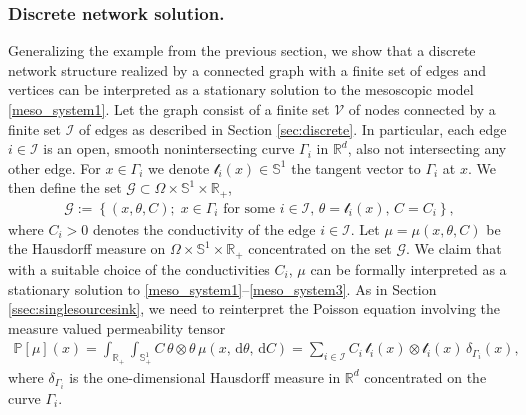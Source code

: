 \documentclass{article}
\numberwithin{equation}{section}
\newcommand{\R}{\mathbb{R}}
\def\[{\begin{eqnarray*}}
\def\]{\end{eqnarray*}}
\def\d{\,\mathrm{d}}
\begin{document}
\subsubsection{Discrete network solution.}\label{ssec:discretenetsol}
Generalizing the example from the previous section, we show that a discrete network structure realized by a connected graph
with a finite set of edges and vertices can be interpreted as a stationary solution to the mesoscopic model \eqref{meso_system1}.
Let the graph consist of a finite set $\mathcal{V}$ of nodes connected by a finite set $\mathcal{I}$ of edges as described in Section \ref{sec:discrete}.
In particular, each edge $i\in \mathcal{I}$ is an open, smooth nonintersecting curve $\Gamma_i$ in $\R^d$, also not intersecting any other edge.
For $x\in\Gamma_i$ we denote $\mathcal{t}_i(x)\in\mathbb{S}^1$ the tangent vector to $\Gamma_i$ at $x$.
We then define the set $\mathcal{G}\subset \Omega\times\mathbb{S}^1\times \R_+$,
\[
   \mathcal{G} := \left\{ (x,\theta,C);\; x\in \Gamma_i \mbox{ for some } i\in\mathcal{I},\, \theta=\mathcal{t}_i(x),\, C=C_i \right\},
\]
where $C_i>0$ denotes the conductivity of the edge $i\in \mathcal{I}$.
Let $\mu = \mu(x,\theta,C)$ be the Hausdorff measure on $\Omega\times\mathbb{S}^1\times \R_+$ concentrated on the set $\mathcal{G}$.
We claim that with a suitable choice of the conductivities $C_i$, $\mu$ can be formally interpreted as a stationary solution to \eqref{meso_system1}--\eqref{meso_system3}.
As in Section \ref{ssec:singlesourcesink}, we need to reinterpret the Poisson equation involving the measure valued permeability tensor
\begin{align*}
   \mathbb{P}[\mu](x) = \int_{\R_+}\int_{\mathbb{S}_+^1} C \, \theta \otimes \theta \, \mu(x, \d\theta, \d C)
      = \sum_{i\in\mathcal{I}} {C}_i \, \mathcal{t}_i(x)\otimes\mathcal{t}_i(x) \, \delta_{\Gamma_i}(x),
\end{align*}
where $\delta_{\Gamma_i}$ is the one-dimensional Hausdorff measure in $\R^d$ concentrated on the curve $\Gamma_i$.
\end{document}
